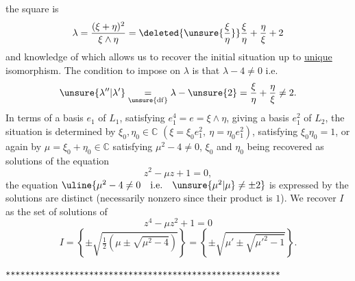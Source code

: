 the square is
\[
 \lambda=\frac{(\xi+\eta)^2}{\xi\wedge\eta}
 =\deleted{\unsure{\frac{\xi}{\eta}}}\frac{\xi}{\eta}+\frac{\eta}{\xi}+2
\]
and knowledge of which allows us to recover the initial situation up to
\uline{unique} isomorphism. The condition to impose on
$\lambda$ is that $\lambda-4\ne0$ i.e.
\[
 \unsure{\lambda''|\lambda'}\underset{\unsure{\mathrm{df}}}{=}\lambda-
 \unsure{2}= \frac{\xi}{\eta}+\frac{\eta}{\xi}\ne2.
\]
In terms of a basis  $e_1$ of $L_1$,
satisfying $e_1^4=e=\xi\wedge\eta$, giving a basis $e_1^2$ of $L_2$,
the situation is determined by 
$\xi_0,\eta_0\in\mathbb C$ $(\xi=\xi_0e_1^2,\ \eta=\eta_0e_1^2)$,
satisfying $\xi_0\eta_0=1$, or again by
$\mu=\xi_0+\eta_0\in\mathbb C$ satisfying $\mu^2-4\ne0$,
$\xi_0$ and $\eta_0$ being recovered as solutions of the equation
\[
 z^2-\mu z+1=0,
\]
the equation $\uline{\mu^2-4\ne0\quad\text{i.e.}\quad\unsure{\mu^2|\mu}\ne\pm2}$
is expressed by the  solutions are distinct (necessarily nonzero since their
product is $1$).  We recover $I$ as the set of solutions of
\[
 z^4-\mu z^2+1=0
\]
\[
 I=\left\{\pm\sqrt{\tfrac12\left(\mu\pm\sqrt{\mu^2-4}\right)}\right\}
 =\left\{\pm\sqrt{\mu'\pm\sqrt{\mu'^2-1}}\right\}.
\]
  
  

 

\texttt{********************************************************}

 

 

 

 

 
 

 

 

